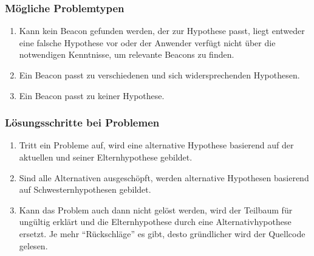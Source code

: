 \subsubsection{Mögliche Problemtypen}
\begin{enumerate}
\item Kann kein Beacon gefunden werden, der zur Hypothese passt, liegt entweder eine falsche Hypothese vor oder der Anwender verfügt nicht über die notwendigen Kenntnisse, um relevante Beacons zu finden. 
\item Ein Beacon passt zu verschiedenen und sich widersprechenden Hypothesen.
\item Ein Beacon passt zu keiner Hypothese.
\end{enumerate}

\subsubsection{Lösungsschritte bei Problemen}
\begin{enumerate}
\item Tritt ein Probleme auf, wird eine alternative Hypothese basierend auf der aktuellen und seiner Elternhypothese gebildet.
\item Sind alle Alternativen ausgeschöpft, werden alternative Hypothesen basierend auf Schwesternhypothesen gebildet.
\item Kann das Problem auch dann nicht gelöst werden, wird der Teilbaum für ungültig erklärt und die Elternhypothese durch eine Alternativhypothese ersetzt. Je mehr ``Rückschläge'' es gibt, desto gründlicher wird der Quellcode gelesen.
\end{enumerate}

